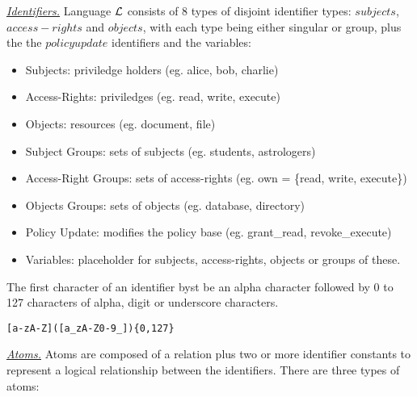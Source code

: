 \documentclass[10pt, twocolumn]{article}
\begin{document}
        \noindent\underline{\emph{Identifiers.}} Language $\cal{L}$ consists of
        8 types of disjoint identifier types: $subjects$, $access-rights$ and
        $objects$, with each type being either singular or group, plus the
        the $policy update$ identifiers and the variables:

        \begin{itemize}
          \item
            Subjects: priviledge holders (eg. alice, bob, charlie)
          \item
            Access-Rights: priviledges (eg. read, write, execute)
          \item
            Objects: resources (eg. document, file)
          \item
            Subject Groups: sets of subjects (eg. students, astrologers)
          \item
            Access-Right Groups: sets of access-rights (eg. own = \{read,
            write, execute\})
          \item
            Objects Groups: sets of objects (eg. database, directory)
          \item
            Policy Update: modifies the policy base (eg. grant\_read,
            revoke\_execute)
          \item
            Variables: placeholder for subjects, access-rights, objects
            or groups of these.
        \end{itemize}

        The first character of an identifier byst be an alpha character
        followed by 0 to 127 characters of alpha, digit or underscore
        characters.

        \begin{verbatim}[a-zA-Z]([a_zA-Z0-9_]){0,127}\end{verbatim}

        \noindent\underline{\emph{Atoms.}} Atoms are composed of a relation
        plus two or more identifier constants to represent a logical
        relationship between the identifiers. There are three types of atoms:
\end{document}
